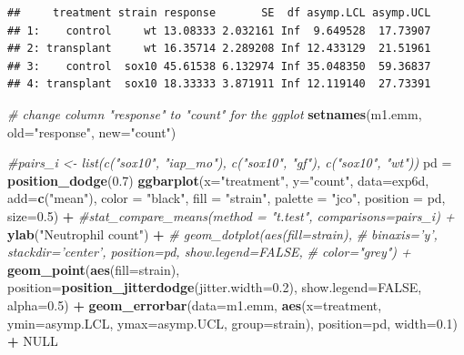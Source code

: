 \documentclass[]{book}
\newenvironment{Shaded}{\begin{snugshade}}{\end{snugshade}}
\newcommand{\CommentTok}[1]{\textcolor[rgb]{0.56,0.35,0.01}{\textit{#1}}}
\newcommand{\DataTypeTok}[1]{\textcolor[rgb]{0.13,0.29,0.53}{#1}}
\newcommand{\FloatTok}[1]{\textcolor[rgb]{0.00,0.00,0.81}{#1}}
\newcommand{\KeywordTok}[1]{\textcolor[rgb]{0.13,0.29,0.53}{\textbf{#1}}}
\newcommand{\NormalTok}[1]{#1}
\newcommand{\OperatorTok}[1]{\textcolor[rgb]{0.81,0.36,0.00}{\textbf{#1}}}
\newcommand{\OtherTok}[1]{\textcolor[rgb]{0.56,0.35,0.01}{#1}}
\newcommand{\StringTok}[1]{\textcolor[rgb]{0.31,0.60,0.02}{#1}}
\begin{document}
\begin{verbatim}
##     treatment strain response       SE  df asymp.LCL asymp.UCL
## 1:    control     wt 13.08333 2.032161 Inf  9.649528  17.73907
## 2: transplant     wt 16.35714 2.289208 Inf 12.433129  21.51961
## 3:    control  sox10 45.61538 6.132974 Inf 35.048350  59.36837
## 4: transplant  sox10 18.33333 3.871911 Inf 12.119140  27.73391
\end{verbatim}

\begin{Shaded}
\begin{Highlighting}[]
\CommentTok{# change column "response" to "count" for the ggplot}
\KeywordTok{setnames}\NormalTok{(m1.emm, }\DataTypeTok{old=}\StringTok{"response"}\NormalTok{, }\DataTypeTok{new=}\StringTok{"count"}\NormalTok{)}
\end{Highlighting}
\end{Shaded}

\begin{Shaded}
\begin{Highlighting}[]
\CommentTok{#pairs_i <- list(c("sox10", "iap_mo"), c("sox10", "gf"), c("sox10", "wt"))}
\NormalTok{pd =}\StringTok{ }\KeywordTok{position_dodge}\NormalTok{(}\FloatTok{0.7}\NormalTok{)}
\KeywordTok{ggbarplot}\NormalTok{(}\DataTypeTok{x=}\StringTok{"treatment"}\NormalTok{, }
          \DataTypeTok{y=}\StringTok{"count"}\NormalTok{,}
          \DataTypeTok{data=}\NormalTok{exp6d,}
          \DataTypeTok{add=}\KeywordTok{c}\NormalTok{(}\StringTok{"mean"}\NormalTok{),}
          \DataTypeTok{color =} \StringTok{"black"}\NormalTok{,}
          \DataTypeTok{fill =} \StringTok{"strain"}\NormalTok{,}
          \DataTypeTok{palette =} \StringTok{"jco"}\NormalTok{,}
          \DataTypeTok{position =}\NormalTok{ pd,}
          \DataTypeTok{size=}\FloatTok{0.5}\NormalTok{) }\OperatorTok{+}
\StringTok{  }\CommentTok{#stat_compare_means(method = "t.test", comparisons=pairs_i) +}
\StringTok{  }\KeywordTok{ylab}\NormalTok{(}\StringTok{"Neutrophil count"}\NormalTok{) }\OperatorTok{+}
\StringTok{  }\CommentTok{# geom_dotplot(aes(fill=strain),}
\StringTok{  }\CommentTok{#              binaxis='y', stackdir='center', position=pd, show.legend=FALSE,}
\StringTok{  }\CommentTok{#              color="grey") +}
\StringTok{  }\KeywordTok{geom_point}\NormalTok{(}\KeywordTok{aes}\NormalTok{(}\DataTypeTok{fill=}\NormalTok{strain), }\DataTypeTok{position=}\KeywordTok{position_jitterdodge}\NormalTok{(}\DataTypeTok{jitter.width=}\FloatTok{0.2}\NormalTok{), }\DataTypeTok{show.legend=}\OtherTok{FALSE}\NormalTok{, }\DataTypeTok{alpha=}\FloatTok{0.5}\NormalTok{) }\OperatorTok{+}
\StringTok{  }\KeywordTok{geom_errorbar}\NormalTok{(}\DataTypeTok{data=}\NormalTok{m1.emm, }\KeywordTok{aes}\NormalTok{(}\DataTypeTok{x=}\NormalTok{treatment, }\DataTypeTok{ymin=}\NormalTok{asymp.LCL, }\DataTypeTok{ymax=}\NormalTok{asymp.UCL, }\DataTypeTok{group=}\NormalTok{strain),}
                \DataTypeTok{position=}\NormalTok{pd, }\DataTypeTok{width=}\FloatTok{0.1}\NormalTok{) }\OperatorTok{+}
\StringTok{  }\OtherTok{NULL}
\end{Highlighting}
\end{Shaded}
\end{document}
